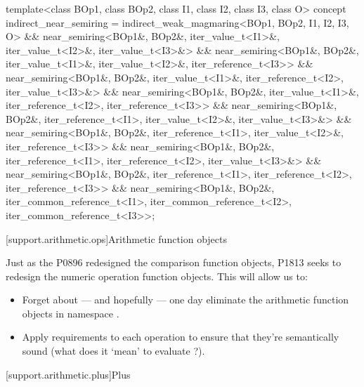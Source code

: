\begin{itemdecl}
template<class BOp1, class BOp2, class I1, class I2, class I3, class O>
concept indirect_near_semiring =
  indirect_weak_magmaring<BOp1, BOp2, I1, I2, I3, O> &&
  near_semiring<BOp1&, BOp2&, iter_value_t<I1>&, iter_value_t<I2>&, iter_value_t<I3>&> &&
  near_semiring<BOp1&, BOp2&, iter_value_t<I1>&, iter_value_t<I2>&, iter_reference_t<I3>> &&
  near_semiring<BOp1&, BOp2&, iter_value_t<I1>&, iter_reference_t<I2>, iter_value_t<I3>&> &&
  near_semiring<BOp1&, BOp2&, iter_value_t<I1>&, iter_reference_t<I2>, iter_reference_t<I3>> &&
  near_semiring<BOp1&, BOp2&, iter_reference_t<I1>, iter_value_t<I2>&, iter_value_t<I3>&> &&
  near_semiring<BOp1&, BOp2&, iter_reference_t<I1>, iter_value_t<I2>&, iter_reference_t<I3>> &&
  near_semiring<BOp1&, BOp2&, iter_reference_t<I1>, iter_reference_t<I2>, iter_value_t<I3>&> &&
  near_semiring<BOp1&, BOp2&, iter_reference_t<I1>, iter_reference_t<I2>, iter_reference_t<I3>> &&
  near_semiring<BOp1&, BOp2&, iter_common_reference_t<I1>, iter_common_reference_t<I2>,
    iter_common_reference_t<I3>>;
\end{itemdecl}

[support.arithmetic.ops]{Arithmetic function objects}

Just as the P0896 redesigned the comparison function objects, P1813 seeks to redesign the numeric
operation function objects. This will allow us to:

\begin{itemize}
   \item Forget about --- and hopefully --- one day eliminate the arithmetic function objects in
         namespace .
   \item Apply requirements to each operation to ensure that they're semantically sound (what does
         it `mean' to evaluate ?).
\end{itemize}

[support.arithmetic.plus]{Plus}


